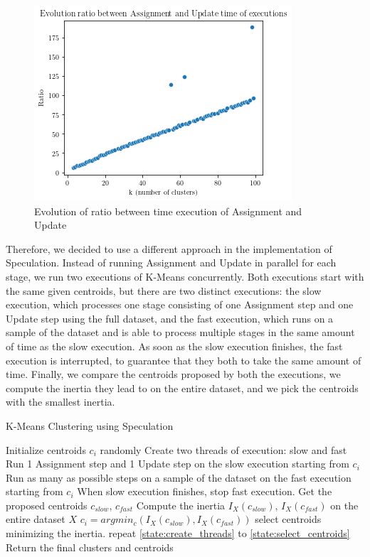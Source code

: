 \begin{figure}[h]
\centering
\includegraphics[width=\linewidth]{./plots/ratio_k.png}
\caption{Evolution of ratio between time execution of Assignment and Update}
\label{fig:ratio_k}
\end{figure}

Therefore, we decided to use a different approach in the implementation of Speculation. Instead of running Assignment and Update in parallel for each stage, we run two executions of K-Means concurrently. Both executions start with the same given centroids, but there are two distinct executions: the slow execution, which processes one stage consisting of one Assignment step and one Update step using the full dataset, and the fast execution, which runs on a sample of the dataset and is able to process multiple stages in the same amount of time as the slow execution. As soon as the slow execution finishes, the fast execution is interrupted, to guarantee that they both to take the same amount of time.
Finally, we compare the centroids proposed by both the executions, we compute the inertia they lead to on the entire dataset, and we pick the centroids with the smallest inertia.
\begin{algorithm}
\caption{K-Means Clustering using Speculation}
\label{alg:kmeans_speculation}
\begin{algorithmic}[1]
\State Initialize centroids $c_i$ randomly
\State Create two threads of execution: slow and fast
\label{state:create_threads}
\State Run 1 Assignment step and 1 Update step on the slow execution starting from $c_i$
\State Run as many as possible steps on a sample of the dataset on the fast execution starting from $c_i$
\State When slow execution finishes, stop fast execution. Get the proposed centroids $c_{slow}$, $c_{fast}$
\State Compute the inertia $I_X(c_{slow})$, $I_X(c_{fast})$ on the entire dataset $X$
\State $c_i = argmin_c(I_X(c_{slow}), I_X(c_{fast}))$ select centroids minimizing the inertia.
\label{state:select_centroids}
    \State repeat \ref{state:create_threads} to \ref{state:select_centroids}
\EndWhile
\State Return the final clusters and centroids
\end{algorithmic}
\end{algorithm}

